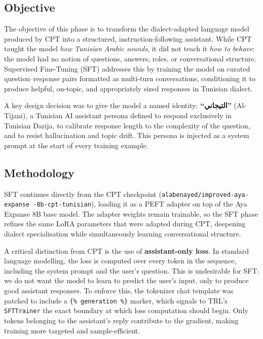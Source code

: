 \documentclass[12pt,a4paper]{report}
\begin{document}
\subsection{Objective}

The objective of this phase is to transform the dialect-adapted language model
produced by CPT into a structured, instruction-following assistant. While CPT
taught the model \emph{how Tunisian Arabic sounds}, it did not teach it
\emph{how to behave}: the model had no notion of questions, answers, roles, or
conversational structure. Supervised Fine-Tuning (SFT) addresses this by
training the model on curated question--response pairs formatted as
multi-turn conversations, conditioning it to produce helpful, on-topic, and
appropriately sized responses in Tunisian dialect.

A key design decision was to give the model a named identity:
\textbf{``التيجاني''} (Al-Tijani), a Tunisian AI assistant persona defined to
respond exclusively in Tunisian Darija, to calibrate response length to the
complexity of the question, and to resist hallucination and topic drift. This
persona is injected as a system prompt at the start of every training example.

\subsection{Methodology}

SFT continues directly from the CPT checkpoint
(\texttt{alabenayed/improved-aya-expanse        -8b-cpt-tunisian}), loading it as a
PEFT adapter on top of the Aya Expanse 8B base model. The adapter weights
remain trainable, so the SFT phase refines the same LoRA parameters that were
adapted during CPT, deepening dialect specialisation while simultaneously
learning conversational structure.

A critical distinction from CPT is the use of \textbf{assistant-only loss}.
In standard language modelling, the loss is computed over every token in the
sequence, including the system prompt and the user's question. This is
undesirable for SFT: we do not want the model to learn to predict the user's
input, only to produce good assistant responses. To enforce this, the tokenizer chat template was patched to include a
\verb|{% generation %}| marker, which signals to TRL's \texttt{SFTTrainer}
the exact boundary at which loss computation should begin. Only tokens belonging to the assistant's reply
contribute to the gradient, making training more targeted and sample-efficient.
\end{document}
